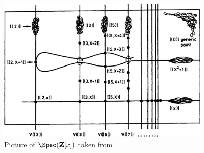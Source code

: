 \begin{solution}
\begin{enumerate}
\begin{figure}
\centering
\includegraphics[width=0.9\textwidth]{images/Spec(Z[x]).png}
\caption{%
Picture of \(\Spec(\mathbf{Z}[x])\) taken from \cite[Chapter~2, \S1, Example~H]{MumfordRedBook}%
}
\label{fig:Spec(Z[x])}
\end{figure}
\end{enumerate}
\let\qed\relax
\end{solution}